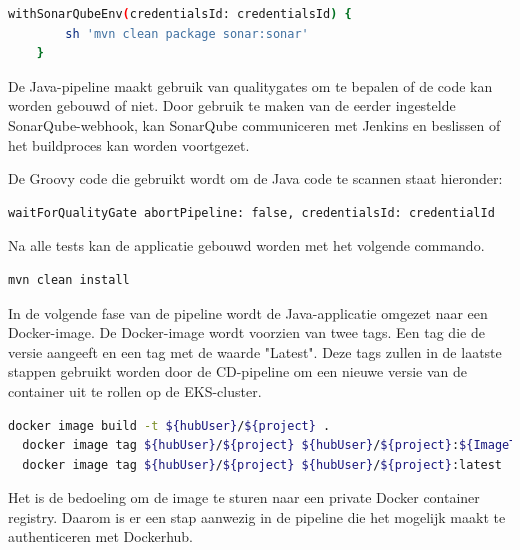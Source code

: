 \begin{lstlisting}[language=bash, style=bashstyle]
  withSonarQubeEnv(credentialsId: credentialsId) {
        sh 'mvn clean package sonar:sonar'
    }
\end{lstlisting}

\vspace{0.5cm}
De Java-pipeline maakt gebruik van qualitygates om te bepalen of de code kan worden gebouwd of niet. Door gebruik te maken van de eerder ingestelde SonarQube-webhook, kan SonarQube communiceren met Jenkins en beslissen of het buildproces kan worden voortgezet. 
\newline

De Groovy code die gebruikt wordt om de Java code te scannen staat hieronder:
\newline

\begin{lstlisting}[language=bash, style=bashstyle]
  waitForQualityGate abortPipeline: false, credentialsId: credentialId
\end{lstlisting}

\vspace{0.5cm}
Na alle tests kan de applicatie gebouwd worden met het volgende commando.
\newline

\begin{lstlisting}[language=bash, style=bashstyle]
  mvn clean install
\end{lstlisting}

\vspace{0.5cm}
In de volgende fase van de pipeline wordt de Java-applicatie omgezet naar een Docker-image. De Docker-image wordt voorzien van twee tags. Een tag die de versie aangeeft en een tag met de waarde "Latest". Deze tags zullen in de laatste stappen gebruikt worden door de CD-pipeline om een nieuwe versie van de container uit te rollen op de EKS-cluster.
\newline

\begin{lstlisting}[language=bash, style=bashstyle]
  docker image build -t ${hubUser}/${project} .
  docker image tag ${hubUser}/${project} ${hubUser}/${project}:${ImageTag}
  docker image tag ${hubUser}/${project} ${hubUser}/${project}:latest
\end{lstlisting}

\vspace{0.5cm}
Het is de bedoeling om de image te sturen naar een private Docker container registry. Daarom is er een stap aanwezig in de pipeline die het mogelijk maakt te authenticeren met Dockerhub.
\newline

